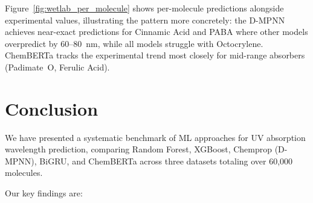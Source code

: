 Figure~\ref{fig:wetlab_per_molecule} shows per-molecule predictions alongside experimental values, illustrating the pattern more concretely: the D-MPNN achieves near-exact predictions for Cinnamic Acid and PABA where other models overpredict by 60--80~nm, while all models struggle with Octocrylene. ChemBERTa tracks the experimental trend most closely for mid-range absorbers (Padimate~O, Ferulic Acid).

\section{Conclusion}
\label{sec:conclusion}

We have presented a systematic benchmark of ML approaches for UV absorption wavelength prediction, comparing Random Forest, XGBoost, Chemprop (D-MPNN), BiGRU, and ChemBERTa across three datasets totaling over 60,000 molecules.

Our key findings are:

